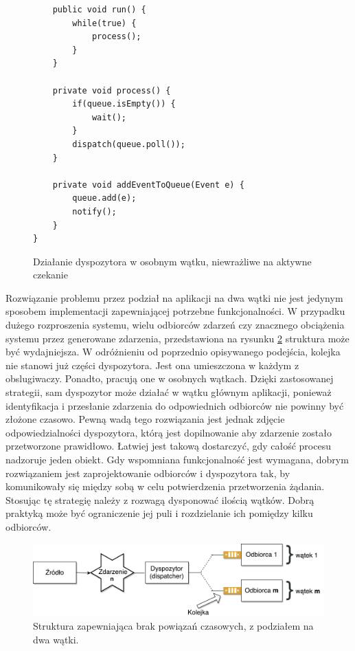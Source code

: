 \documentclass[a4paper]{book}
\begin{document}
{\begin{figure}
\begin{lstlisting}
	public void run() {
		while(true) {
			process();
		}
	}
	
	private void process() {
		if(queue.isEmpty()) {
			wait();
		}
		dispatch(queue.poll());
	}
	
	private void addEventToQueue(Event e) {
		queue.add(e);
		notify();
	}
}
\end{lstlisting}
\caption{Działanie dyspozytora w osobnym wątku, niewrażliwe na aktywne czekanie}
\label{id:fig:listing:dispatcherWithoutBusyWaiting}
\end{figure}
Rozwiązanie problemu przez podział na aplikacji na dwa wątki nie jest jedynym sposobem implementacji zapewniającej potrzebne funkcjonalności. W przypadku dużego rozproszenia systemu, wielu odbiorców zdarzeń czy znacznego obciążenia systemu przez generowane zdarzenia, przedstawiona na rysunku \ref{id:fig:4} struktura może być wydajniejsza. W odróżnieniu od poprzednio opisywanego podejścia, kolejka nie stanowi już części dyspozytora. Jest ona umieszczona w każdym z obslugiwaczy. Ponadto, pracują one w osobnych wątkach. Dzięki zastosowanej strategii, sam dyspozytor może działać w wątku głównym aplikacji, ponieważ identyfikacja i przesłanie zdarzenia do odpowiednich odbiorców nie powinny być złożone czasowo. Pewną wadą tego rozwiązania jest jednak zdjęcie odpowiedzialności dyspozytora, którą jest dopilnowanie aby zdarzenie zostało przetworzone prawidłowo. Łatwiej jest takową dostarczyć, gdy całość procesu nadzoruje jeden obiekt. Gdy wspomniana funkcjonalność jest wymagana, dobrym rozwiązaniem jest zaprojektowanie odbiorców i dyspozytora tak, by komunikowały się między sobą w celu potwierdzenia przetworzenia żądania. Stosując tę strategię należy z rozwagą dysponować ilością wątków. Dobrą praktyką może być ograniczenie jej puli i rozdzielanie ich pomiędzy kilku odbiorców.

\begin{figure}
	\centering
	\includegraphics[width=1.0\textwidth]{./img/EDA_AsyncHandler.pdf}
	\caption{Struktura zapewniająca brak powiązań czasowych, z podziałem na dwa wątki.}
	\label{id:fig:4}
\end{figure}

}
\end{document}
